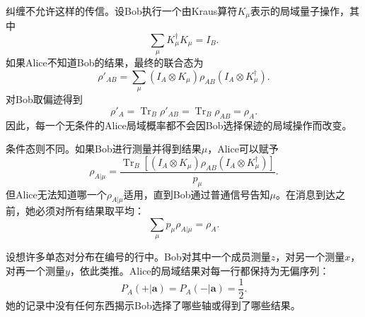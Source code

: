 纠缠不允许这样的传信。设Bob执行一个由Kraus算符\(K_\mu\)表示的局域量子操作，其中
\begin{equation}
\sum_\mu K_\mu^\dagger K_\mu=I_B.
\end{equation}
如果Alice不知道Bob的结果，最终的联合态为
\begin{equation}
\rho'_{AB}
=\sum_\mu
(I_A\otimes K_\mu)\rho_{AB}
(I_A\otimes K_\mu^\dagger).
\end{equation}
对Bob取偏迹得到
\begin{equation}
\rho'_A
=\operatorname{Tr}_B\rho'_{AB}
=\operatorname{Tr}_B\rho_{AB}
=\rho_A.
\label{eq:l7-no-signaling}
\end{equation}
因此，每一个无条件的Alice局域概率都不会因Bob选择保迹的局域操作而改变。

条件态则不同。如果Bob进行测量并得到结果\(\mu\)，Alice可以赋予
\begin{equation}
\rho_{A|\mu}
=\frac{
\operatorname{Tr}_B\!\left[
(I_A\otimes K_\mu)\rho_{AB}
(I_A\otimes K_\mu^\dagger)
\right]
}{p_\mu}.
\label{eq:l7-conditioned-state}
\end{equation}
但Alice无法知道哪一个\(\rho_{A|\mu}\)适用，直到Bob通过普通信号告知\(\mu\)。在消息到达之前，她必须对所有结果取平均：
\begin{equation}
\sum_\mu p_\mu\rho_{A|\mu}=\rho_A.
\label{eq:l7-conditioned-average}
\end{equation}

\begin{classroomqa}
\end{classroomqa}

\begin{classroomqa}
\end{classroomqa}

设想许多单态对分布在编号的行中。Bob对其中一个成员测量\(z\)，对另一个测量\(x\)，对再一个测量\(y\)，依此类推。Alice的局域结果对每一行都保持为无偏序列：
\begin{equation}
P_A(+|\mathbf a)=P_A(-|\mathbf a)=\frac12.
\label{eq:l7-alice-marginal}
\end{equation}
她的记录中没有任何东西揭示Bob选择了哪些轴或得到了哪些结果。

